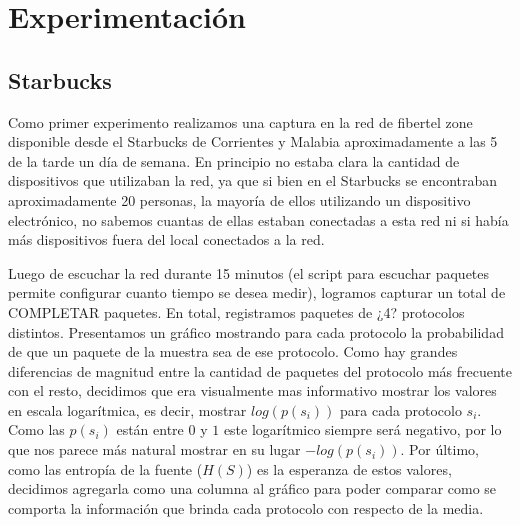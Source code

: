 \section{Experimentación}
\subsection{Starbucks}
Como primer experimento realizamos una captura en la red de fibertel zone disponible desde el Starbucks de Corrientes y Malabia aproximadamente a las 5 de la tarde un día de semana. En principio no estaba clara la cantidad de dispositivos que utilizaban la red, ya que si bien en el Starbucks se encontraban aproximadamente 20 personas,  la mayoría de ellos utilizando un dispositivo electrónico, no sabemos cuantas de ellas estaban conectadas a esta red ni si había más dispositivos fuera del local conectados a la red.\bigskip

Luego de escuchar la red durante 15 minutos (el script para escuchar paquetes permite configurar cuanto tiempo se desea medir), logramos capturar un total de COMPLETAR paquetes. En total, registramos paquetes de ¿4? protocolos distintos. Presentamos un gráfico mostrando para cada protocolo la probabilidad de que un paquete de la muestra sea de ese protocolo. Como hay grandes diferencias de magnitud entre la cantidad de paquetes del protocolo más frecuente con el resto, decidimos que era visualmente mas informativo mostrar los valores en escala logarítmica, es decir, mostrar $log(p(s_i))$ para cada protocolo $s_i$. Como las $p(s_i)$ están entre $0$ y $1$ este logarítmico siempre será negativo, por lo que nos parece más natural mostrar en su lugar $-log(p(s_i))$. Por último, como las entropía de la fuente ($H(S)$) es la esperanza de estos valores, decidimos agregarla como una columna al gráfico para poder comparar como se comporta la información que brinda cada protocolo con respecto de la media.